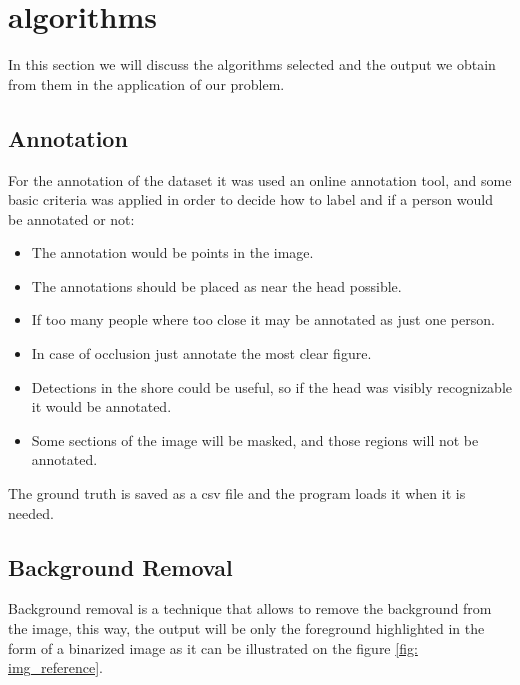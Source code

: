 \documentclass[11pt]{article}
\begin{document}
\section{algorithms}
In this section we will discuss the algorithms selected and the output we obtain from them in the application of our problem.

\subsection{Annotation}

For the annotation of the dataset it was used an online annotation tool, and some basic criteria was applied in order to decide how to label and if a person would be annotated or not:
\begin{itemize}
  \item The annotation would be points in the image.
  \item The annotations should be placed as near the head possible.
  \item If too many people where too close it may be annotated as just one person.
  \item In case of occlusion just annotate the most clear figure.
  \item Detections in the shore could be useful, so if the head was visibly recognizable it would be annotated.
  \item Some sections of the image will be masked, and those regions will not be annotated.
\end{itemize}

The ground truth is saved as a csv file and the program loads it when it is needed.

\subsection{Background Removal}
Background removal is a technique that allows to remove the background from the image, this way, the output will be only the foreground highlighted in the form of a binarized image as it can be illustrated on the figure \ref{fig: img_reference}.
\end{document}
